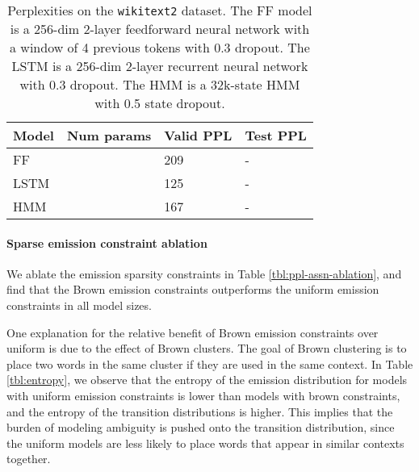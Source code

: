 \documentclass[11pt,a4paper]{article}
\begin{document}
\begin{table}[!t]
\centering
\caption{\label{tbl:ppl-wikitext2}
Perplexities on the \texttt{wikitext2} dataset.
The FF model is a 256-dim 2-layer feedforward neural network
with a window of 4 previous tokens with 0.3 dropout.
The LSTM is a 256-dim 2-layer recurrent neural network with 0.3 dropout.
The HMM is a 32k-state HMM with 0.5 state dropout.
}
\begin{tabular}{llll}
\toprule
Model & Num params & Valid PPL & Test PPL\\
\midrule
FF    &            & 209       & -       \\
LSTM  &            & 125       & -       \\
HMM   &            & 167       & -       \\
\bottomrule
\end{tabular}
\end{table}

\paragraph{Sparse emission constraint ablation}
We ablate the emission sparsity constraints in Table \ref{tbl:ppl-assn-ablation},
and find that the Brown emission constraints outperforms the uniform emission constraints
in all model sizes.

One explanation for the relative benefit of Brown emission constraints over uniform
is due to the effect of Brown clusters.
The goal of Brown clustering is to place two words in the same cluster
if they are used in the same context.
In Table \ref{tbl:entropy}, we observe that the entropy of the emission distribution
for models with uniform emission
constraints is lower than models with brown constraints,
and the entropy of the transition distributions is higher.
This implies that the burden of modeling ambiguity is pushed onto
the transition distribution,
since the uniform models are less likely to place words that appear in
similar contexts together.



\end{document}
